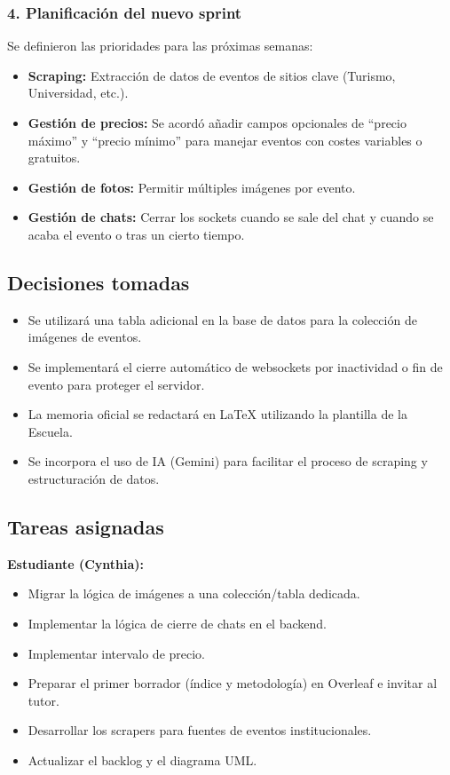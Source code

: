 \subsubsection*{4. Planificación del nuevo sprint}
Se definieron las prioridades para las próximas semanas:

\begin{itemize}
    \item \textbf{Scraping:} Extracción de datos de eventos de sitios clave (Turismo, Universidad, etc.).
    \item \textbf{Gestión de precios:} Se acordó añadir campos opcionales de ``precio máximo'' y ``precio mínimo'' para manejar eventos con costes variables o gratuitos.
    \item \textbf{Gestión de fotos:} Permitir múltiples imágenes por evento.
    \item \textbf{Gestión de chats:} Cerrar los sockets cuando se sale del chat y cuando se acaba el evento o tras un cierto tiempo.
\end{itemize}

\subsection*{Decisiones tomadas}
\begin{itemize}
    \item Se utilizará una tabla adicional en la base de datos para la colección de imágenes de eventos.
    \item Se implementará el cierre automático de websockets por inactividad o fin de evento para proteger el servidor.
    \item La memoria oficial se redactará en \LaTeX{} utilizando la plantilla de la Escuela.
    \item Se incorpora el uso de IA (Gemini) para facilitar el proceso de scraping y estructuración de datos.
\end{itemize}

\subsection*{Tareas asignadas}

\textbf{Estudiante (Cynthia):}
\begin{itemize}
    \item Migrar la lógica de imágenes a una colección/tabla dedicada.
    \item Implementar la lógica de cierre de chats en el backend.
    \item Implementar intervalo de precio.
    \item Preparar el primer borrador (índice y metodología) en Overleaf e invitar al tutor.
    \item Desarrollar los scrapers para fuentes de eventos institucionales.
    \item Actualizar el backlog y el diagrama UML.
\end{itemize}

